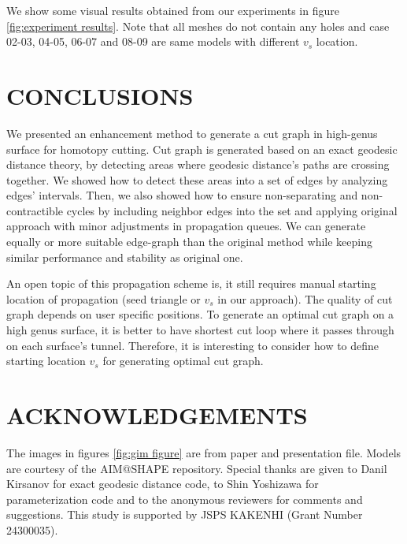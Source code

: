 \documentclass[a4paper,twoside]{article}
\begin{document}
\begin{table}[h]
{\begin{tabular}{|C{16pt}|C{18pt}|C{23pt}|C{23pt}|C{23pt}|C{23pt}|C{23pt}|C{23pt}|}
		\hline		
	\end{tabular}}
\end{table}

We show some visual results obtained from our experiments in figure \ref{fig:experiment results}.  Note that all meshes do not contain any holes and case 02-03, 04-05, 06-07 and 08-09 are same models with different $v_s$ location.
\vspace{-6pt}
\section{\uppercase{Conclusions}}
\label{sec:conclusion}

\noindent We presented an enhancement method to generate a cut graph in high-genus surface for homotopy cutting. Cut graph is generated based on an exact geodesic distance theory, by detecting areas where geodesic distance's paths are crossing together. We showed how to detect these areas into a set of edges by analyzing edges' intervals. Then, we also showed how to ensure non-separating and non-contractible cycles by including neighbor edges into the set and applying original approach with minor adjustments in propagation queues. We can generate equally or more suitable edge-graph than the original method while keeping similar performance and stability as original one.

An open topic of this propagation scheme is, it still requires manual starting location of propagation (seed triangle or $v_s$ in our approach). The quality of cut graph depends on user specific positions. To generate an optimal cut graph on a high genus surface, it is better to have shortest cut loop where it passes through on each surface's tunnel. Therefore, it is interesting to consider how to define starting location $v_s$ for generating optimal cut graph.


\section*{\uppercase{Acknowledgements}}
\noindent The images in figures \ref{fig:gim figure} are from \cite{Gu:2002:GI:566654.566589} paper and presentation file. Models are courtesy of the AIM@SHAPE repository. Special thanks are given to Danil Kirsanov for exact geodesic distance code, to Shin Yoshizawa for parameterization code and to the anonymous reviewers for comments and suggestions.
This study is supported by JSPS KAKENHI (Grant Number 24300035).
\end{document}
